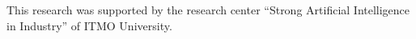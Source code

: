 \documentclass[preprint,12pt]{elsarticle}
\begin{document}
This research was supported by the research center ``Strong Artificial Intelligence in Industry'' of ITMO University.





 






\end{document}

